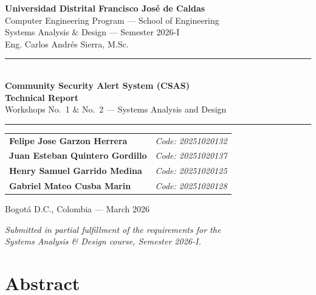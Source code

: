 \documentclass[12pt, oneside]{article}
\begin{document}

\begin{titlepage}
\centering
\vspace*{1cm}

{\large\bfseries Universidad Distrital Francisco Jos\'e de Caldas}\\[4pt]
{\normalsize Computer Engineering Program --- School of Engineering}\\[2pt]
{\normalsize Systems Analysis \& Design --- Semester 2026-I}\\[2pt]
{\normalsize Eng. Carlos Andr\'es Sierra, M.Sc.}

\vspace{1.8cm}
\rule{\textwidth}{1pt}\\[12pt]
{\LARGE\bfseries Community Security Alert System (CSAS)\\[8pt]
Technical Report}\\[8pt]
{\large Workshops No.~1 \& No.~2 --- Systems Analysis and Design}\\[4pt]
\rule{\textwidth}{1pt}

\vspace{1.8cm}
{\normalsize
\begin{tabular}{ll}
\textbf{Felipe Jose Garzon Herrera}     & \textit{Code: 20251020132} \\[6pt]
\textbf{Juan Esteban Quintero Gordillo} & \textit{Code: 20251020137} \\[6pt]
\textbf{Henry Samuel Garrido Medina}   & \textit{Code: 20251020125} \\[6pt]
\textbf{Gabriel Mateo Cusba Marin}     & \textit{Code: 20251020128} \\
\end{tabular}}

\vspace{1.8cm}
{\normalsize Bogot\'a D.C., Colombia --- March 2026}

\vfill
{\small\textit{Submitted in partial fulfillment of the requirements for the\\
Systems Analysis \& Design course, Semester 2026-I.}}
\end{titlepage}


\section*{Abstract}
\end{document}
